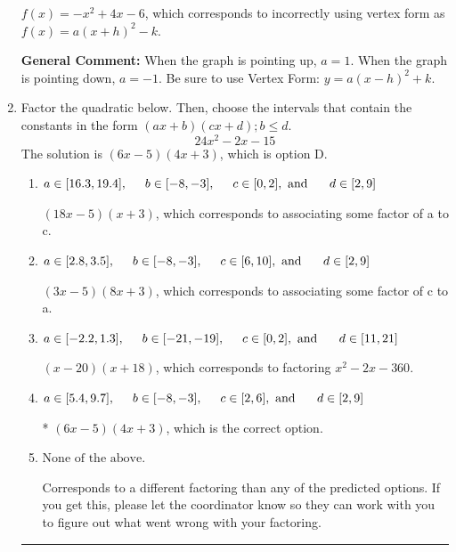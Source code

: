 \documentclass{extbook}[14pt]
\newcommand{\litem}[1]{\item #1

\rule{\textwidth}{0.4pt}}
\begin{document}
\begin{enumerate}
{\begin{enumerate}[label=\Alph*.]
$f(x)=-x^{2} +4 x -6$, which corresponds to incorrectly using vertex form as $f(x) = a(x+h)^2 - k$.
\end{enumerate}

\textbf{General Comment:} When the graph is pointing up, $a=1$. When the graph is pointing down, $a=-1$. Be sure to use Vertex Form: $y = a(x-h)^2+k$.
}
\litem{
Factor the quadratic below. Then, choose the intervals that contain the constants in the form $(ax+b)(cx+d); b \leq d.$
\[ 24x^{2} -2 x -15 \]
The solution is \( (6x -5)(4x + 3) \), which is option D.\begin{enumerate}[label=\Alph*.]
\item \( a \in [16.3, 19.4], \hspace*{5mm} b \in [-8, -3], \hspace*{5mm} c \in [0, 2], \text{ and } \hspace*{5mm} d \in [2, 9] \)

 $(18x -5)(x + 3)$, which corresponds to associating some factor of a to c.
\item \( a \in [2.8, 3.5], \hspace*{5mm} b \in [-8, -3], \hspace*{5mm} c \in [6, 10], \text{ and } \hspace*{5mm} d \in [2, 9] \)

 $(3x -5)(8x + 3)$, which corresponds to associating some factor of c to a.
\item \( a \in [-2.2, 1.3], \hspace*{5mm} b \in [-21, -19], \hspace*{5mm} c \in [0, 2], \text{ and } \hspace*{5mm} d \in [11, 21] \)

 $(x -20)(x + 18)$, which corresponds to factoring $x^{2} -2 x -360$.
\item \( a \in [5.4, 9.7], \hspace*{5mm} b \in [-8, -3], \hspace*{5mm} c \in [2, 6], \text{ and } \hspace*{5mm} d \in [2, 9] \)

* $(6x -5)(4x + 3)$, which is the correct option.
\item \( \text{None of the above.} \)

 Corresponds to a different factoring than any of the predicted options. If you get this, please let the coordinator know so they can work with you to figure out what went wrong with your factoring.
\end{enumerate}

}
\end{enumerate}
\end{document}
